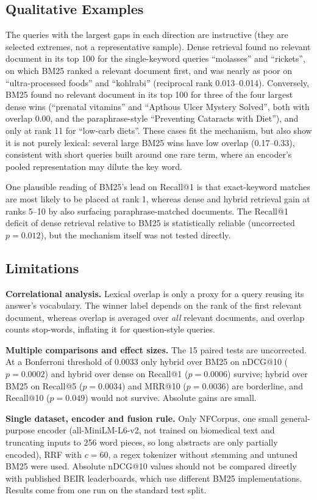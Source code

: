\documentclass[10pt,letterpaper,twocolumn]{article}
\begin{document}
\subsection{Qualitative Examples}
The queries with the largest gaps in each direction are instructive (they are selected extremes, not a representative sample). Dense retrieval found no relevant document in its top 100 for the single-keyword queries ``molasses'' and ``rickets'', on which BM25 ranked a relevant document first, and was nearly as poor on ``ultra-processed foods'' and ``kohlrabi'' (reciprocal rank 0.013--0.014). Conversely, BM25 found no relevant document in its top 100 for three of the four largest dense wins (``prenatal vitamins'' and ``Apthous Ulcer Mystery Solved'', both with overlap $0.00$, and the paraphrase-style ``Preventing Cataracts with Diet''), and only at rank 11 for ``low-carb diets''. These cases fit the mechanism, but also show it is not purely lexical: several large BM25 wins have low overlap (0.17--0.33), consistent with short queries built around one rare term, where an encoder's pooled representation may dilute the key word.

One plausible reading of BM25's lead on Recall@1 is that exact-keyword matches are most likely to be placed at rank 1, whereas dense and hybrid retrieval gain at ranks 5--10 by also surfacing paraphrase-matched documents. The Recall@1 deficit of dense retrieval relative to BM25 is statistically reliable (uncorrected $p=0.012$), but the mechanism itself was not tested directly.

\subsection{Limitations}
\textbf{Correlational analysis.} Lexical overlap is only a proxy for a query reusing its answer's vocabulary. The winner label depends on the rank of the first relevant document, whereas overlap is averaged over \emph{all} relevant documents, and overlap counts stop-words, inflating it for question-style queries.

\textbf{Multiple comparisons and effect sizes.} The 15 paired tests are uncorrected. At a Bonferroni threshold of 0.0033 only hybrid over BM25 on nDCG@10 ($p=0.0002$) and hybrid over dense on Recall@1 ($p=0.0006$) survive; hybrid over BM25 on Recall@5 ($p=0.0034$) and MRR@10 ($p=0.0036$) are borderline, and Recall@10 ($p=0.049$) would not survive. Absolute gains are small.

\textbf{Single dataset, encoder and fusion rule.} Only NFCorpus, one small general-purpose encoder (all-MiniLM-L6-v2, not trained on biomedical text and truncating inputs to 256 word pieces, so long abstracts are only partially encoded), RRF with $c=60$, a regex tokenizer without stemming and untuned BM25 were used. Absolute nDCG@10 values should not be compared directly with published BEIR leaderboards, which use different BM25 implementations. Results come from one run on the standard test split.
\end{document}
